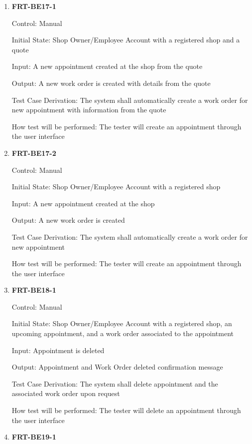 \documentclass[12pt, titlepage]{article}
\begin{document}
\begin{enumerate}

	\item \textbf{FRT-BE17-1}

	      Control: Manual

	      Initial State: Shop Owner/Employee Account with a registered shop and a quote

	      Input: A new appointment created at the shop from the quote

	      Output: A new work order is created with details from the quote

	      Test Case Derivation: The system shall automatically create a work order for new appointment with
	      information from the quote

	      How test will be performed: The tester will create an appointment through the user interface

	\item \textbf{FRT-BE17-2}

	      Control: Manual

	      Initial State: Shop Owner/Employee Account with a registered shop

	      Input: A new appointment created at the shop

	      Output: A new work order is created

	      Test Case Derivation: The system shall automatically create a work order for new appointment

	      How test will be performed: The tester will create an appointment through the user interface

	\item \textbf{FRT-BE18-1}

	      Control: Manual

	      Initial State: Shop Owner/Employee Account with a registered shop, an upcoming appointment, and a
	      work order associated to the appointment

	      Input: Appointment is deleted

	      Output: Appointment and Work Order deleted confirmation message

	      Test Case Derivation: The system shall delete appointment and the associated work order upon
	      request

	      How test will be performed: The tester will delete an appointment through the user interface

	\item \textbf{FRT-BE19-1}


\end{enumerate}
\end{document}
